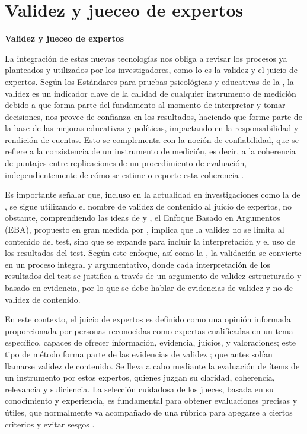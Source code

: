 \section{Validez y jueceo de expertos}\label{sec-Validezyjueceo}

\textbf{Validez y jueceo de expertos}

La integración de estas nuevas tecnologías nos obliga a revisar los
procesos ya planteados y utilizados por los investigadores, como lo es
la validez y el juicio de expertos. Según los Estándares para pruebas
psicológicas y educativas de la \textcite{AERA2014}, la validez es
un indicador clave de la calidad de cualquier instrumento de medición
debido a que forma parte del fundamento al momento de interpretar y
tomar decisiones, nos provee de confianza en los resultados, haciendo
que forme parte de la base de las mejoras educativas y políticas,
impactando en la responsabilidad y rendición de cuentas. Esto se
complementa con la noción de confiabilidad, que se refiere a la
consistencia de un instrumento de medición, es decir, a la coherencia de
puntajes entre replicaciones de un procedimiento de evaluación,
independientemente de cómo se estime o reporte esta coherencia \cite{AERA2014}.

Es importante señalar que, incluso en la actualidad en investigaciones
como la de \textcite{Galicia2017}, se sigue utilizando el nombre de
validez de contenido al juicio de expertos, no obstante, comprendiendo
las ideas de \textcite{Kane2006,Kane2013} y \textcite{Chapelle2021}, el
Enfoque Basado en Argumentos (EBA), propuesto en gran medida por \textcite{Kane2006,Kane2013}, implica que la validez no se limita al contenido del
test, sino que se expande para incluir la interpretación y el uso de los
resultados del test. Según este enfoque, así como la \textcite{AERA2014}, la validación se convierte en un proceso integral y
argumentativo, donde cada interpretación de los resultados del test se
justifica a través de un argumento de validez estructurado y basado en
evidencia, por lo que se debe hablar de evidencias de validez y no de
validez de contenido.

En este contexto, el juicio de expertos es definido como una opinión
informada proporcionada por personas reconocidas como expertas
cualificadas en un tema específico, capaces de ofrecer información,
evidencia, juicios, y valoraciones; este tipo de método forma parte de
las evidencias de validez \cite{AERA2014}; que antes solían
llamarse validez de contenido. Se lleva a cabo mediante la evaluación de
ítems de un instrumento por estos expertos, quienes juzgan su claridad,
coherencia, relevancia y suficiencia. La selección cuidadosa de los
jueces, basada en su conocimiento y experiencia, es fundamental para
obtener evaluaciones precisas y útiles, que normalmente va acompañado de
una rúbrica para apegarse a ciertos criterios y evitar sesgos \cite{Galicia2017}.


